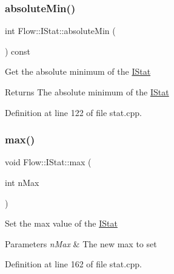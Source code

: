 \hypertarget{class_flow_1_1_i_stat_aa36a96f53fa8cfe2f3810a33f11b7b9e}{}\label{class_flow_1_1_i_stat_aa36a96f53fa8cfe2f3810a33f11b7b9e} 
\subsubsection{\texorpdfstring{absolute\+Min()}{absoluteMin()}}
{\footnotesize\ttfamily int Flow\+::\+I\+Stat\+::absolute\+Min (\begin{DoxyParamCaption}{ }\end{DoxyParamCaption}) const}

Get the absolute minimum of the \hyperlink{class_flow_1_1_i_stat}{I\+Stat} \begin{DoxyReturn}{Returns}
The absolute minimum of the \hyperlink{class_flow_1_1_i_stat}{I\+Stat} 
\end{DoxyReturn}


Definition at line 122 of file stat.\+cpp.

\hypertarget{class_flow_1_1_i_stat_ac1606c768c151092154f67264fc19fe3}{}\label{class_flow_1_1_i_stat_ac1606c768c151092154f67264fc19fe3} 
\subsubsection{\texorpdfstring{max()}{max()}\hspace{0.1cm}{\footnotesize\ttfamily [1/2]}}
{\footnotesize\ttfamily void Flow\+::\+I\+Stat\+::max (\begin{DoxyParamCaption}\item[{int}]{n\+Max }\end{DoxyParamCaption})}

Set the max value of the \hyperlink{class_flow_1_1_i_stat}{I\+Stat} 
\begin{DoxyParams}{Parameters}
{\em n\+Max} & The new max to set \\
\hline
\end{DoxyParams}


Definition at line 162 of file stat.\+cpp.

\hypertarget{class_flow_1_1_i_stat_afe5c49dcc98e7960bbc8d7064e7c831a}{}\label{class_flow_1_1_i_stat_afe5c49dcc98e7960bbc8d7064e7c831a} 

